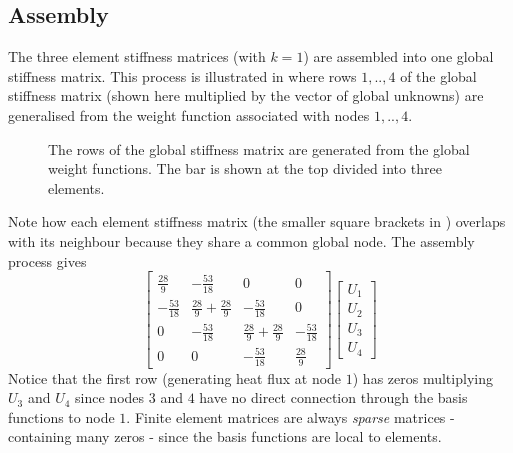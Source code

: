 \subsection{Assembly}

The three element stiffness matrices (with $k=1$) are assembled into one
global stiffness matrix. This process is
illustrated in  where rows $1, .. , 4$ of the global
stiffness matrix (shown here multiplied by the vector of global unknowns) are
generalised from the weight function associated with nodes $1, .. , 4$.
\begin{figure} \centering
 
 \caption{The rows of the global stiffness matrix are generated from the
   global weight functions. The bar is shown at the top divided into three
   elements.}
 \label{fig:asfig}
\end{figure}
 
Note how each element stiffness matrix (the smaller square brackets in
) overlaps with its neighbour because they share a common
global node. The assembly process gives
\begin{equation*}
  \begin{bmatrix}
    \frac{28}{9} & -\frac{53}{18} & 0 & 0 \\
    -\frac{53}{18} & \frac{28}{9}+\frac{28}{9} & -\frac{53}{18} & 0 \\
    0 & -\frac{53}{18} & \frac{28}{9}+\frac{28}{9} & -\frac{53}{18} \\
    0 & 0 &-\frac{53}{18} & \frac{28}{9}
  \end{bmatrix}
  \begin{bmatrix}
    U_{1} \\
    U_{2} \\
    U_{3} \\
    U_{4}
  \end{bmatrix}
\end{equation*}
Notice that the first row (generating heat flux at node $1$) has zeros
multiplying $U_{3}$ and $ U_{4}$ since nodes $3$ and $4$ have no direct connection
through the basis functions to node $1$. Finite element matrices are always
\emph{sparse} matrices - containing many zeros - since the basis functions are
local to elements.

